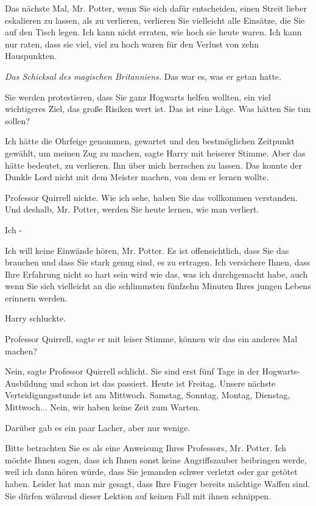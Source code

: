 \glqq Das nächste Mal, Mr. Potter, wenn Sie sich dafür entscheiden, einen Streit
lieber eskalieren zu lassen, als zu verlieren, verlieren Sie vielleicht alle
Einsätze, die Sie auf den Tisch legen. Ich kann nicht erraten, wie hoch sie
heute waren. Ich kann nur raten, dass sie viel, viel zu hoch waren für den
Verlust von zehn Hauspunkten.\grqq{}

\emph{Das Schicksal des magischen Britanniens.}
Das war es, was er getan hatte.

\glqq Sie werden protestieren, dass Sie ganz Hogwarts helfen wollten, ein viel
wichtigeres Ziel, das große Risiken wert ist. Das ist eine Lüge. Was hätten Sie
tun sollen?\grqq{}

\glqq Ich hätte die Ohrfeige genommen, gewartet und den bestmöglichen Zeitpunkt
gewählt, um meinen Zug zu machen\grqq{}, sagte Harry mit heiserer Stimme. \glqq
Aber das hätte bedeutet, zu verlieren. Ihn über mich herrschen zu lassen. Das
konnte der Dunkle Lord nicht mit dem Meister machen, von dem er lernen
wollte.\grqq{}

Professor Quirrell nickte. \glqq Wie ich sehe, haben Sie das vollkommen
verstanden. Und deshalb, Mr. Potter, werden Sie heute lernen, wie man
verliert.\grqq{}

\glqq Ich -\grqq{}

\glqq Ich will keine Einwände hören, Mr. Potter. Es ist offensichtlich, dass Sie
das brauchen und dass Sie stark genug sind, es zu ertragen. Ich versichere
Ihnen, dass Ihre Erfahrung nicht so hart sein wird wie das, was ich durchgemacht
habe, auch wenn Sie sich vielleicht an die schlimmsten fünfzehn Minuten Ihres
jungen Lebens erinnern werden.\grqq{}

Harry schluckte.

\glqq Professor Quirrell\grqq{}, sagte er mit leiser Stimme, \glqq können wir
das ein anderes Mal machen?\grqq{}

\glqq Nein\grqq{}, sagte Professor Quirrell schlicht. \glqq Sie sind erst fünf
Tage in der Hogwarts-Ausbildung und schon ist das passiert. Heute ist Freitag.
Unsere nächste Verteidigungsstunde ist am Mittwoch. Samstag, Sonntag, Montag,
Dienstag, Mittwoch... Nein, wir haben keine Zeit zum Warten.\grqq{}

Darüber gab es ein paar Lacher, aber nur wenige.

\glqq Bitte betrachten Sie es als eine Anweisung Ihres Professors, Mr. Potter.
Ich möchte Ihnen sagen, dass ich Ihnen sonst keine Angriffszauber beibringen
werde, weil ich dann hören würde, dass Sie jemanden schwer verletzt oder gar
getötet haben. Leider hat man mir gesagt, dass Ihre Finger bereits mächtige
Waffen sind. Sie dürfen während dieser Lektion auf keinen Fall mit ihnen
schnippen.\grqq{}

